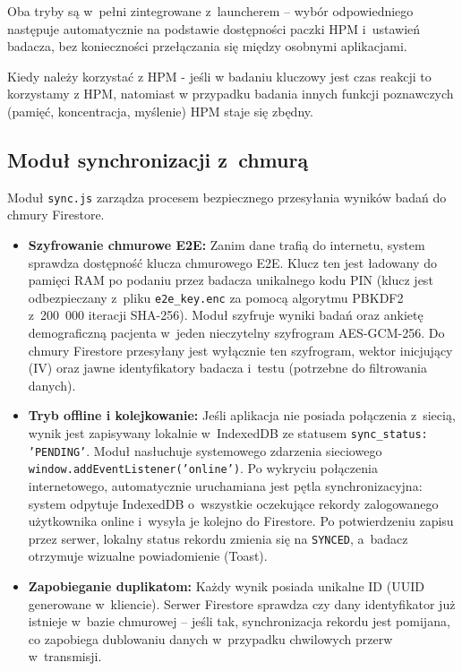 \documentclass[12pt, a4paper, oneside]{report}
\begin{document}
Oba tryby są w~pełni zintegrowane z~launcherem -- wybór odpowiedniego następuje automatycznie na podstawie dostępności paczki HPM i~ustawień badacza, bez konieczności przełączania się między osobnymi aplikacjami.

Kiedy należy korzystać z HPM - jeśli w badaniu kluczowy jest czas reakcji to korzystamy z HPM, natomiast w przypadku badania innych funkcji poznawczych (pamięć, koncentracja, myślenie) HPM staje się zbędny.

\subsection{Moduł synchronizacji z~chmurą}
\label{subsec:impl-sync}

Moduł \texttt{sync.js} zarządza procesem bezpiecznego przesyłania wyników badań do chmury Firestore.
\begin{itemize}
	\item \textbf{Szyfrowanie chmurowe E2E:} Zanim dane trafią do internetu, system sprawdza dostępność klucza chmurowego E2E. Klucz ten jest ładowany do pamięci RAM po podaniu przez badacza unikalnego kodu PIN (klucz jest odbezpieczany z~pliku \texttt{e2e\_key.enc} za pomocą algorytmu PBKDF2 z~200~000 iteracji SHA-256). Moduł szyfruje wyniki badań oraz ankietę demograficzną pacjenta w~jeden nieczytelny szyfrogram AES-GCM-256. Do chmury Firestore przesyłany jest wyłącznie ten szyfrogram, wektor inicjujący (IV) oraz jawne identyfikatory badacza i~testu (potrzebne do filtrowania danych).
	\item \textbf{Tryb offline i kolejkowanie:} Jeśli aplikacja nie posiada połączenia z~siecią, wynik jest zapisywany lokalnie w~IndexedDB ze statusem \texttt{sync\_status: 'PENDING'}. Moduł nasłuchuje systemowego zdarzenia sieciowego \\ \texttt{window.addEventListener('online')}. Po wykryciu połączenia internetowego, automatycznie uruchamiana jest pętla synchronizacyjna: system odpytuje IndexedDB o~wszystkie oczekujące rekordy zalogowanego użytkownika online i~wysyła je kolejno do Firestore. Po potwierdzeniu zapisu przez serwer, lokalny status rekordu zmienia się na \texttt{SYNCED}, a~badacz otrzymuje wizualne powiadomienie (Toast).
	\item \textbf{Zapobieganie duplikatom:} Każdy wynik posiada unikalne ID (UUID generowane w~kliencie). Serwer Firestore sprawdza czy dany identyfikator już istnieje w~bazie chmurowej – jeśli tak, synchronizacja rekordu jest pomijana, co zapobiega dublowaniu danych w~przypadku chwilowych przerw w~transmisji.
\end{itemize}
\end{document}
